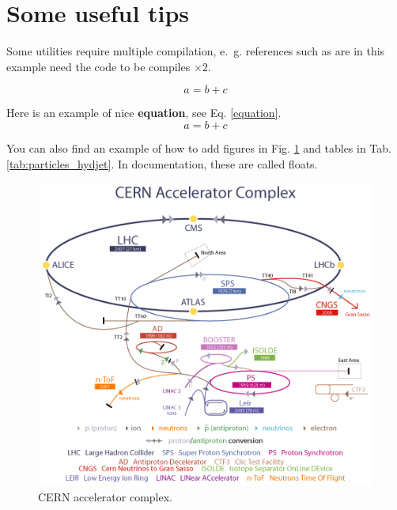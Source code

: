 \documentclass{article}
\begin{document}
\section*{Some useful tips}
\label{tips}
Some utilities require multiple compilation, e.~g. references such as are in this example need the code to be compiles $\times 2$.

$$ a = b+c $$


Here is an example of nice \textbf{equation}, see Eq. \ref{equation}.
\begin{equation}
 a = b+c
 \label{equation}
\end{equation}

You can also find an example of how to add figures in Fig. \ref{fig} and tables in Tab. \ref{tab:particles_hydjet}. In documentation, these are called floats.
\begin{figure}[h]
  \begin{center}
      \includegraphics[width = 0.6 \textwidth]{img/cern}
      \caption{CERN accelerator complex.}
    \label{fig}
  \end{center}
\end{figure}
\end{document}
